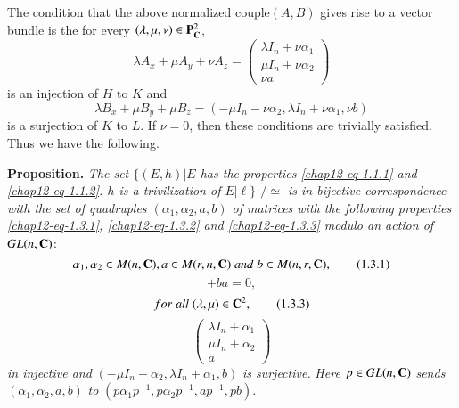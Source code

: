 The condition that the above normalized couple$(A, B)$ gives rise to a vector bundle is the for every $(\lambda, \mu, \nu) \in \mathbf{P}_{\mathbf{C}}^{2}$,
$$
\lambda A_{x}+ \mu A_{y} + \nu A_{z} = \begin{pmatrix}
\lambda I_{n} + \nu \alpha_{1}\\
\mu I_{n} +\nu\alpha_{2}\\
\nu a
\end{pmatrix}
$$
is an injection of $H$ to $K$ and
$$
\lambda B_{x} + \mu B_{y} + \mu B_{z} =(-\mu I_{n}-\nu \alpha_{2},\lambda I_{n} +\nu\alpha_{1}, \nu b)
$$
is a surjection of $K$ to $L$. If $\nu =0$, then these conditions are trivially satisfied. Thus we have the following.

\medskip
\noindent
{\bfseries {} Proposition.\label{chap12-prop-1.3}} \textit{The set $\{(E, h) | E$ {\rm has the
properties} \eqref{chap12-eq-1.1.1} {\rm and} \eqref{chap12-eq-1.1.2}. $h$ {\rm is a trivilization of} $E|\ell\}$ $/\simeq$ is in bijective correspondence with the set of quadruples $(\alpha_{1}, \alpha_{2}, a,b)$ of matrices with the following properties \eqref{chap12-eq-1.3.1}, \eqref{chap12-eq-1.3.2} and \eqref{chap12-eq-1.3.3} modulo an action of $GL(n, \mathbf{C})$}:
\begin{equation*}
\alpha_{1}, \alpha_{2} \in M (n, \mathbf{C}), a \in M (r, n, \mathbf{C}) \;and\; b\in M(n,r, \mathbf{C}), \tag{1.3.1}\label{chap12-eq-1.3.1}
\end{equation*}\pageoriginale
\begin{equation*}
[\alpha_{1}, \alpha_{2}] + ba =0,\tag{1.3.2}\label{chap12-eq-1.3.2}
\end{equation*}
\begin{equation*}
for \; all  \;(\lambda, \mu) \in \mathbf{C}^{2},\tag{1.3.3}\label{chap12-eq-1.3.3}
\end{equation*}
$$
\begin{pmatrix}
\lambda I_{n} + \alpha_{1}\\
\mu I_{n} + \alpha_{2}\\
a
\end{pmatrix}
$$
\textit{in injective and} $(-\mu I_{n}-\alpha_{2}, \lambda I_{n} + \alpha_{1}, b)$ \textit{is surjective.}
\textit{Here} $p \in GL(n, \mathbf{C})$ \textit{sends} $(\alpha_{1}, \alpha_{2}, a, b)$ \textit{to} $(p\alpha_{1}p^{-1}, p\alpha_{2}p^{-1}, ap^{-1}, pb)$.

